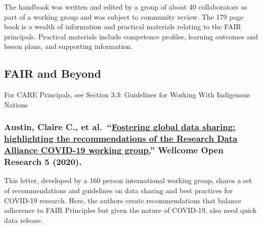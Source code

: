 \documentclass[
]{book}
\begin{document}
The handbook was written and edited by a group of about 40 collaborators as part of a working group and was subject to community review. The 179 page book is a wealth of information and practical materials relating to the FAIR principals. Practical materials include competence profiles, learning outcomes and lesson plans, and supporting information.

\hypertarget{fair-and-beyond}{%
\subsection{FAIR and Beyond}\label{fair-and-beyond}}

For CARE Principals, see Section 3.3: Guidelines for Working With Indigenous Nations

\hypertarget{austin-claire-c.-et-al.-fostering-global-data-sharing-highlighting-the-recommendations-of-the-research-data-alliance-covid-19-working-group.-wellcome-open-research-5-2020.}{%
\subsubsection*{\texorpdfstring{Austin, Claire C., et al.~``\href{https://www.ncbi.nlm.nih.gov/pmc/articles/PMC7808050/}{Fostering global data sharing: highlighting the recommendations of the Research Data Alliance COVID-19 working group.}'' Wellcome Open Research 5 (2020).}{Austin, Claire C., et al.~``Fostering global data sharing: highlighting the recommendations of the Research Data Alliance COVID-19 working group.'' Wellcome Open Research 5 (2020).}}\label{austin-claire-c.-et-al.-fostering-global-data-sharing-highlighting-the-recommendations-of-the-research-data-alliance-covid-19-working-group.-wellcome-open-research-5-2020.}}

This letter, developed by a 160 person international working group, shares a set of recommendations and guidelines on data sharing and best practices for COVID-19 research. Here, the authors create recommendations that balance adherence to FAIR Principles but given the nature of COVID-19, also need quick data release.
\end{document}
